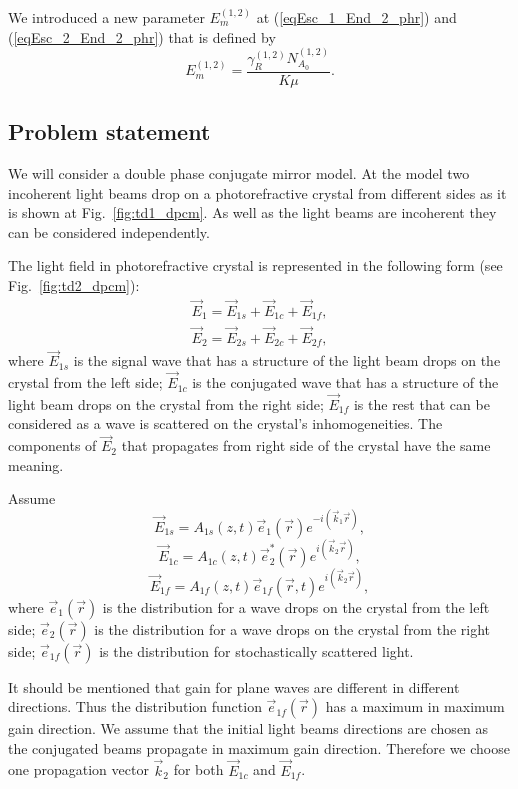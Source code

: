 We introduced a new parameter $E_m^{(1,2)}$ at (\ref{eqEsc_1_End_2_phr}) and
(\ref{eqEsc_2_End_2_phr}) that is defined by
\[
E_m^{(1,2)} = \frac{\gamma_R^{(1,2)} N_{A_0}^{(1,2)}}{K \mu}.
\] 

\subsection{Problem statement}



We will consider a double phase conjugate mirror model. At the model
two incoherent light beams drop on a photorefractive 
crystal from different sides as it is shown at
Fig.~\ref{fig:td1_dpcm}. As well as the light beams are incoherent
they can be considered independently.



The light field in photorefractive crystal is represented in the
following form (see Fig.~\ref{fig:td2_dpcm}):
\[ 
\begin{array}{l} 
\vec{E}_1=\vec{E}_{1s}+\vec{E}_{1c}+\vec{E}_{1f},\\ 
\vec{E}_2=\vec{E}_{2s}+\vec{E}_{2c}+\vec{E}_{2f}, 
\end{array} 
\] 
where $\vec{E}_{1s}$ is the signal wave that has a structure of the
light beam drops on the crystal from the left side; $\vec{E}_{1c}$ is the
conjugated wave that has a structure of the
light beam drops on the crystal from the right side; $\vec{E}_{1f}$ is
the rest that can be considered as a wave is scattered on the
crystal's inhomogeneities. The components of 
$\vec{E}_2$ that propagates from right side of the crystal have the
same meaning.

Assume
\[
\vec{E}_{1s}=A_{1s}(z,t)\vec{e}_1(\vec{r})e^{-i(\vec{k}_1\vec{r})},
\]
\[
\vec{E}_{1c}=A_{1c}(z,t)\vec{e}_2^\ast(\vec{r})e^{i(\vec{k}_2\vec{r})}, 
\]
\[
\vec{E}_{1f}=A_{1f}(z,t)\vec{e}_{1f}(\vec{r},t)e^{i(\vec{k}_2\vec{r})}, 
\]
where $\vec{e}_1(\vec{r})$ is the distribution for a wave drops on the
crystal from the left side; $\vec{e}_2(\vec{r})$ is the distribution for a
wave drops on the crystal from the right side; $\vec{e}_{1f}(\vec{r})$
is the distribution for stochastically scattered light.

It should be mentioned that gain for plane waves are different in
different directions. Thus the distribution function
$\vec{e}_{1f}(\vec{r})$ has a maximum in maximum gain direction.
We assume that the initial light beams directions are chosen as the
conjugated beams propagate in maximum gain direction. Therefore we
choose one propagation vector $\vec{k}_2$ for both $\vec{E}_{1c}$ and
$\vec{E}_{1f}$. 

